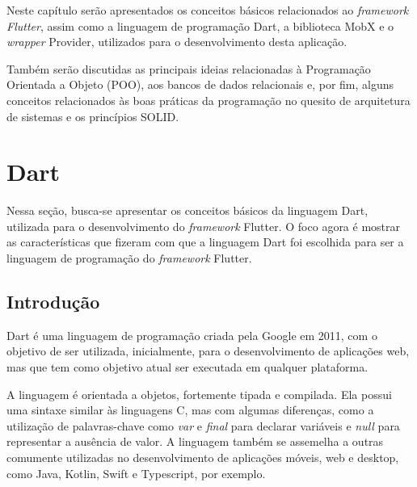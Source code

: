 
\label{Cap:Teoria}

Neste capítulo serão apresentados os conceitos básicos relacionados ao \textit{framework Flutter}, assim como a linguagem de programação Dart, a biblioteca MobX e o \textit{wrapper} Provider, utilizados para o desenvolvimento desta aplicação.

Também serão discutidas as principais ideias relacionadas à Programação Orientada a Objeto (POO), aos bancos de dados relacionais e, por fim, alguns conceitos relacionados às boas práticas da programação no quesito de arquitetura de sistemas e os princípios SOLID.

\section{Dart}
\label{cap2:Sec:Dart}

Nessa seção, busca-se apresentar os conceitos básicos da linguagem Dart, utilizada para o desenvolvimento do \textit{framework} Flutter. O foco agora é mostrar as características que fizeram com que a linguagem Dart foi escolhida para ser a linguagem de programação do \textit{framework} Flutter.

\subsection{Introdução}
\label{cap2:SubSec:Introducao}

Dart é uma linguagem de programação criada pela Google em 2011, com o objetivo de ser utilizada, inicialmente, para o desenvolvimento de aplicações web, mas que tem como objetivo atual ser executada em qualquer plataforma.

A linguagem é orientada a objetos, fortemente tipada e compilada. Ela possui uma sintaxe similar às linguagens C, mas com algumas diferenças, como a utilização de palavras-chave como \textit{var} e \textit{final} para declarar variáveis e \textit{null} para representar a ausência de valor. A linguagem também se assemelha a outras comumente utilizadas no desenvolvimento de aplicações móveis, web e desktop, como Java, Kotlin, Swift e Typescript, por exemplo.


